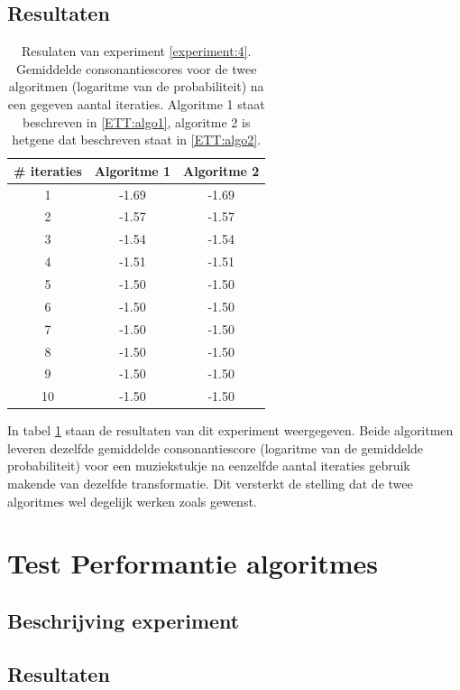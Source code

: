 \subsection{Resultaten}

\begin{table}
  \centering
  \begin{tabular}{c | c | c }    
    \# iteraties & Algoritme 1 & Algoritme 2 \\
    \hline
    1 & -1.69 & -1.69\\
    2 & -1.57 & -1.57\\
    3 & -1.54 & -1.54\\
    4 & -1.51 & -1.51\\
    5 & -1.50 & -1.50\\
    6 & -1.50 & -1.50\\
    7 & -1.50 & -1.50\\
    8 & -1.50 & -1.50\\
    9 & -1.50 & -1.50\\
    10 & -1.50 & -1.50\\
  \end{tabular}
  \caption{Resulaten van experiment \ref{experiment:4}. Gemiddelde consonantiescores voor de twee algoritmen (logaritme van de probabiliteit) na een gegeven aantal iteraties. Algoritme 1 staat beschreven in \ref{ETT:algo1}, algoritme 2 is hetgene dat beschreven staat in \ref{ETT:algo2}.}
  \label{tabel:res4}
\end{table}

In tabel \ref{tabel:res4} staan de resultaten van dit experiment weergegeven. Beide algoritmen leveren dezelfde gemiddelde consonantiescore (logaritme van de gemiddelde probabiliteit) voor een muziekstukje na eenzelfde aantal iteraties gebruik makende van dezelfde transformatie. Dit versterkt de stelling dat de twee algoritmes wel degelijk werken zoals gewenst.

\section{Test Performantie algoritmes}
\label{experiment:7}
\subsection{Beschrijving experiment}

\subsection{Resultaten}

